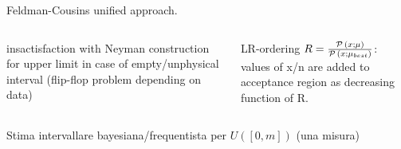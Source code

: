 \begin{frame}{Feldman-Cousins unified approach.}
\begin{columns}[T]
\begin{column}{0.5\textwidth}
insactisfaction with Neyman construction for upper limit in case of empty/unphysical interval (flip-flop problem depending on data)
\end{column}
\begin{column}{0.5\textwidth}
LR-ordering $R=\frac{\operatorname{\mathcal{P}}{(x;\mu)}}{\operatorname{\mathcal{P}}{(x;\mu_{best})}}$: values of x/n are added to acceptance region as decreasing function of R.
\end{column}
\end{columns}
\end{frame}

\begin{frame}{Stima intervallare bayesiana/frequentista per $U([0,m])$ (una misura)}


\end{frame}
